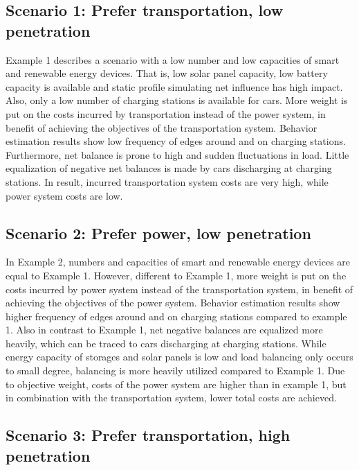 \subsection*{Scenario 1: Prefer transportation, low penetration}
Example 1 describes a scenario with a low number and low capacities of smart and renewable energy devices. That is, low solar panel capacity, low battery capacity is available and static profile simulating net influence has high impact. Also, only a low number of charging stations is available for cars. More weight is put on the costs incurred by transportation instead of the power system, in benefit of achieving the objectives of the transportation system. Behavior estimation results show low frequency of edges around and on charging stations. Furthermore, net balance is prone to high and sudden fluctuations in load. Little equalization of negative net balances is made by cars discharging at charging stations. In result, incurred transportation system costs are very high, while power system costs are low.

\subsection*{Scenario 2: Prefer power, low penetration}

In Example 2, numbers and capacities of smart and renewable energy devices are equal to Example 1. However, different to Example 1, more weight is put on the costs incurred by power system instead of the transportation system, in benefit of achieving the objectives of the power system. Behavior estimation results show higher frequency of edges around and on charging stations compared to example 1. Also in contrast to Example 1, net negative balances are equalized more heavily, which can be traced to cars discharging at charging stations. While energy capacity of storages and solar panels is low and load balancing only occurs to small degree, balancing is more heavily utilized compared to Example 1. Due to objective weight, costs of the power system are higher than in example 1, but in combination with the transportation system, lower total costs are achieved.

\subsection*{Scenario 3: Prefer transportation, high penetration}

